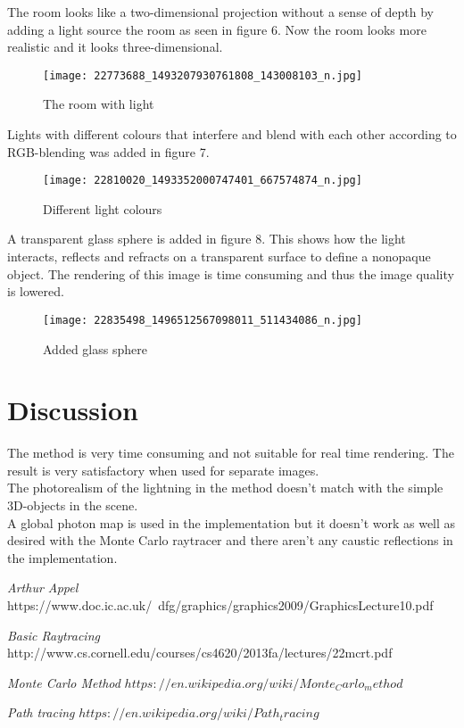 \documentclass[a4paper,12pt]{IEEEtran}
\begin{document}
The room looks like a two-dimensional projection without a sense of depth by adding a light source the room as seen in figure 6. Now the room looks more realistic and it looks three-dimensional. 

\begin{figure}[h!]
\texttt{[image: 22773688\_1493207930761808\_143008103\_n.jpg]}
\caption{The room with light}
\end{figure}

Lights with different colours that interfere and blend with each other according to RGB-blending was added in figure 7.
\begin{figure}[h!]
\texttt{[image: 22810020\_1493352000747401\_667574874\_n.jpg]}
\caption{Different light colours}
\end{figure}

A transparent glass sphere is added in figure 8. This shows how the light interacts, reflects and refracts on a transparent surface to define a nonopaque object. The rendering of this image is time consuming and thus the image quality is lowered. 
\begin{figure}[h!]
\texttt{[image: 22835498\_1496512567098011\_511434086\_n.jpg]}
\caption{Added glass sphere}
\end{figure}

\section{Discussion}
The method is very time consuming and not suitable for real time rendering. The result is very satisfactory when used for separate images. \\
The photorealism of the lightning in the method doesn't match with the simple 3D-objects in the scene.
\\
A global photon map is used in the implementation but it doesn't work as well as desired with the Monte Carlo raytracer and there aren't any caustic reflections in the implementation.
\begin{thebibliography}{00}
\emph{Arthur Appel}\newline
https://www.doc.ic.ac.uk/~dfg/graphics/graphics2009/GraphicsLecture10.pdf

\emph{Basic Raytracing}\newline
http://www.cs.cornell.edu/courses/cs4620/2013fa/lectures/22mcrt.pdf

\emph{Monte Carlo Method}\newline
$https://en.wikipedia.org/wiki/Monte_Carlo_method$

\emph{Path tracing}\newline
$https://en.wikipedia.org/wiki/Path_tracing$

\end{thebibliography}
\end{document}
